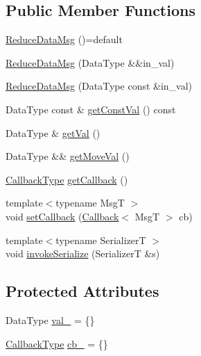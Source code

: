 \subsection*{Public Member Functions}
\begin{DoxyCompactItemize}
\item 
\hyperlink{structvt_1_1collective_1_1reduce_1_1operators_1_1_reduce_data_msg_ab5f090157aff94fa6b1c233ccc5e0e04}{Reduce\+Data\+Msg} ()=default
\item 
\hyperlink{structvt_1_1collective_1_1reduce_1_1operators_1_1_reduce_data_msg_af154e207e5fbafd8e78baa5986410b34}{Reduce\+Data\+Msg} (Data\+Type \&\&in\+\_\+val)
\item 
\hyperlink{structvt_1_1collective_1_1reduce_1_1operators_1_1_reduce_data_msg_aced8854f365eaf92ca71d527337fc804}{Reduce\+Data\+Msg} (Data\+Type const \&in\+\_\+val)
\item 
Data\+Type const  \& \hyperlink{structvt_1_1collective_1_1reduce_1_1operators_1_1_reduce_data_msg_a57969fcf4e5b2eda7aa6ec2cccc0c785}{get\+Const\+Val} () const
\item 
Data\+Type \& \hyperlink{structvt_1_1collective_1_1reduce_1_1operators_1_1_reduce_data_msg_ae4ed4be0171d566910da896198f38131}{get\+Val} ()
\item 
Data\+Type \&\& \hyperlink{structvt_1_1collective_1_1reduce_1_1operators_1_1_reduce_data_msg_a2f8b87edccc2e4db3c193350f066ca08}{get\+Move\+Val} ()
\item 
\hyperlink{structvt_1_1collective_1_1reduce_1_1operators_1_1_reduce_data_msg_a299d0d7f62e0e631ef344e345d89a4f3}{Callback\+Type} \hyperlink{structvt_1_1collective_1_1reduce_1_1operators_1_1_reduce_data_msg_a108582ea1b61db277a5dae6ac08cc708}{get\+Callback} ()
\item 
{\footnotesize template$<$typename MsgT $>$ }\\void \hyperlink{structvt_1_1collective_1_1reduce_1_1operators_1_1_reduce_data_msg_afc3de5443774bc3838c9ccca05054210}{set\+Callback} (\hyperlink{namespacevt_a36db99df4c973d48b1118a293fff533f}{Callback}$<$ MsgT $>$ cb)
\item 
{\footnotesize template$<$typename SerializerT $>$ }\\void \hyperlink{structvt_1_1collective_1_1reduce_1_1operators_1_1_reduce_data_msg_ab93fa8f4d9d0008dbe3d3f24829e3e1f}{invoke\+Serialize} (SerializerT \&s)
\end{DoxyCompactItemize}
\subsection*{Protected Attributes}
\begin{DoxyCompactItemize}
\item 
Data\+Type \hyperlink{structvt_1_1collective_1_1reduce_1_1operators_1_1_reduce_data_msg_a3d393a0bf3245aeac348b66be4e566f9}{val\+\_\+} = \{\}
\item 
\hyperlink{structvt_1_1collective_1_1reduce_1_1operators_1_1_reduce_data_msg_a299d0d7f62e0e631ef344e345d89a4f3}{Callback\+Type} \hyperlink{structvt_1_1collective_1_1reduce_1_1operators_1_1_reduce_data_msg_a89c7b9270ac15672f38c7256abe3c044}{cb\+\_\+} = \{\}
\end{DoxyCompactItemize}
